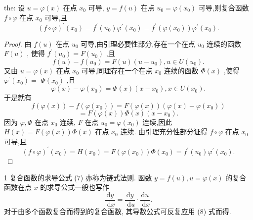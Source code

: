 \begin{theorem}{}{the:}
设 \(u = \varphi \left( x\right)\) 在点 \({x}_{0}\) 可导, \(y = f\left( u\right)\) 在点 \({u}_{0} = \varphi \left( {x}_{0}\right)\) 可导,则复合函数 \(f \circ  \varphi\) 在点 \({x}_{0}\) 可导,且
\[
{\left( f \circ  \varphi \right) }^{\prime }\left( {x}_{0}\right)  = {f}^{\prime }\left( {u}_{0}\right) {\varphi }^{\prime }\left( {x}_{0}\right)  = {f}^{\prime }\left( {\varphi \left( {x}_{0}\right) }\right) {\varphi }^{\prime }\left( {x}_{0}\right) . \tag{7}
\]
\end{theorem}

\begin{proof}
由 \(f\left( u\right)\) 在点 \({u}_{0}\) 可导,由引理必要性部分,存在一个在点 \({u}_{0}\) 连续的函数 \(F\left( u\right)\) , 使得 \({f}^{\prime }\left( {u}_{0}\right)  = F\left( {u}_{0}\right)\) ,且
\[
f\left( u\right)  - f\left( {u}_{0}\right)  = F\left( u\right) \left( {u - {u}_{0}}\right) ,u \in  U\left( {u}_{0}\right) .
\]
又由 \(u = \varphi \left( x\right)\) 在点 \({x}_{0}\) 可导,同理存在一个在点 \({x}_{0}\) 连续的函数 \(\Phi \left( x\right)\) ,使得 \({\varphi }^{\prime }\left( {x}_{0}\right)  =\)  \(\Phi \left( {x}_{0}\right)\) ,且
\[
\varphi \left( x\right)  - \varphi \left( {x}_{0}\right)  = \Phi \left( x\right) \left( {x - {x}_{0}}\right) ,x \in  U\left( {x}_{0}\right) .
\]
于是就有
\[
f\left( {\varphi \left( x\right) }\right)  - f\left( {\varphi \left( {x}_{0}\right) }\right)  = F\left( {\varphi \left( x\right) }\right) \left( {\varphi \left( x\right)  - \varphi \left( {x}_{0}\right) }\right)
\]
\[
= F\left( {\varphi \left( x\right) }\right) \Phi \left( x\right) \left( {x - {x}_{0}}\right) .
\]
因为 \(\varphi ,\Phi\) 在点 \({x}_{0}\) 连续, \(F\) 在点 \({u}_{0} = \varphi \left( {x}_{0}\right)\) 连续,因此 \(H\left( x\right)  = F\left( {\varphi \left( x\right) }\right) \Phi \left( x\right)\) 在点 \({x}_{0}\) 连续. 由引理充分性部分证得 \(f \circ  \varphi\) 在点 \({x}_{0}\) 可导,且
\[
{\left( f \circ  \varphi \right) }^{\prime }\left( {x}_{0}\right)  = H\left( {x}_{0}\right)  = F\left( {\varphi \left( {x}_{0}\right) }\right) \Phi \left( {x}_{0}\right)  = {f}^{\prime }\left( {u}_{0}\right) {\varphi }^{\prime }\left( {x}_{0}\right) .
\]
\end{proof}

\begin{remark}
1 复合函数的求导公式 (7) 亦称为链式法则. 函数 \(y = f\left( u\right) ,u = \varphi \left( x\right)\) 的复合函数在点 \(x\) 的求导公式一般也写作
\[
\frac{\mathrm{d}y}{\mathrm{\;d}x} = \frac{\mathrm{d}y}{\mathrm{\;d}u} \cdot  \frac{\mathrm{d}u}{\mathrm{\;d}x}. \tag{8}
\]
对于由多个函数复合而得到的复合函数, 其导数公式可反复应用 (8) 式而得.
\end{remark}


